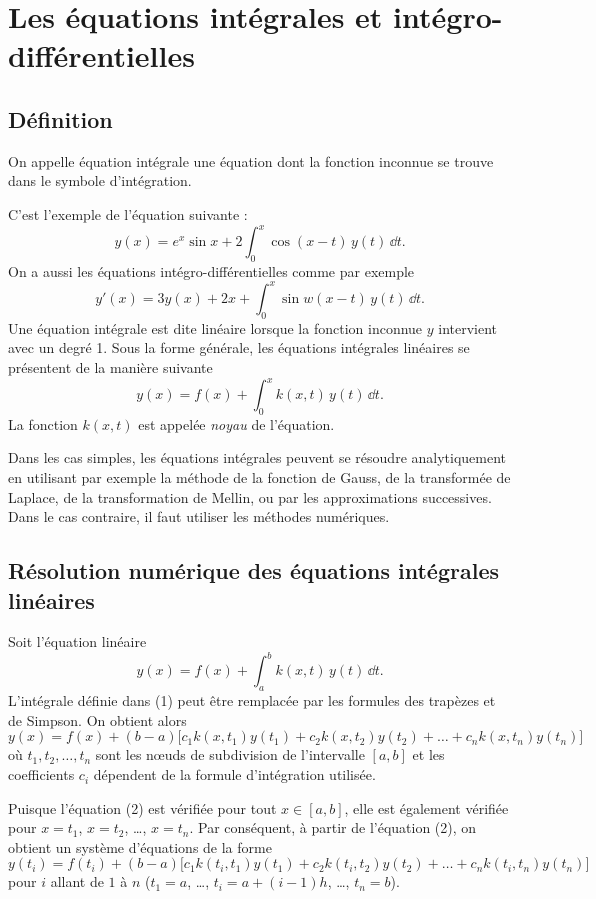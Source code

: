 \section{Les équations intégrales et intégro-différentielles}

\subsection{Définition}

On appelle équation intégrale une équation dont la fonction inconnue se trouve
dans le symbole d'intégration.

C'est l'exemple de l'équation suivante :
\[
  y(x) = e^x\sin x + 2\int_0^x \cos(x - t)\,y(t)\,\dd t .
\]
On a aussi les équations intégro-différentielles comme par exemple
\[
  y'(x) = 3y(x) + 2x + \int_0^x \sin w(x - t)\,y(t)\,\dd t .
\]
Une équation intégrale est dite linéaire lorsque la fonction inconnue $y$
intervient avec un degré 1. Sous la forme générale, les équations intégrales
linéaires se présentent de la manière suivante
\[
  y(x) = f(x) + \int_0^x k(x,t)\,y(t)\,\dd t .
\]
La fonction $k(x,t)$ est appelée \emph{noyau} de l'équation.

Dans les cas simples, les équations intégrales peuvent se résoudre
analytiquement en utilisant par exemple la méthode de la fonction de Gauss, de
la transformée de Laplace, de la transformation de Mellin, ou par les
approximations successives. Dans le cas contraire, il faut utiliser les
méthodes numériques.

\subsection{Résolution numérique des équations intégrales linéaires}

Soit l'équation linéaire
\begin{equation}
  y(x) = f(x) + \int_a^b k(x,t)\,y(t)\,\dd t .
  \tag{1}
\end{equation}
L'intégrale définie dans (1) peut être remplacée par les formules des trapèzes
et de Simpson. On obtient alors
\begin{equation}
  y(x) = f(x) + (b - a)\bigl[c_1k(x,t_1)y(t_1) + c_2k(x,t_2)y(t_2) + \dots
         + c_nk(x,t_n)y(t_n)\bigr]
  \tag{2}
\end{equation}
où $t_1, t_2, \dots, t_n$ sont les n\oe uds de subdivision de l'intervalle
$[a,b]$ et les coefficients $c_i$ dépendent de la formule d'intégration
utilisée.

Puisque l'équation (2) est vérifiée pour tout $x \in [a,b]$, elle est également
vérifiée pour $x = t_1$, $x = t_2$, \dots, $x = t_n$. Par conséquent, à partir
de l'équation (2), on obtient un système d'équations de la forme
\begin{equation}
  y(t_i) = f(t_i) + (b - a)\bigl[c_1k(t_i,t_1)y(t_1) + c_2k(t_i,t_2)y(t_2) + \dots
           + c_nk(t_i,t_n)y(t_n)\bigr]
  \tag{3}
\end{equation}
pour $i$ allant de $1$ à $n$ ($t_1 = a$, \dots, $t_i = a + (i-1)h$, \dots,
$t_n = b$).

